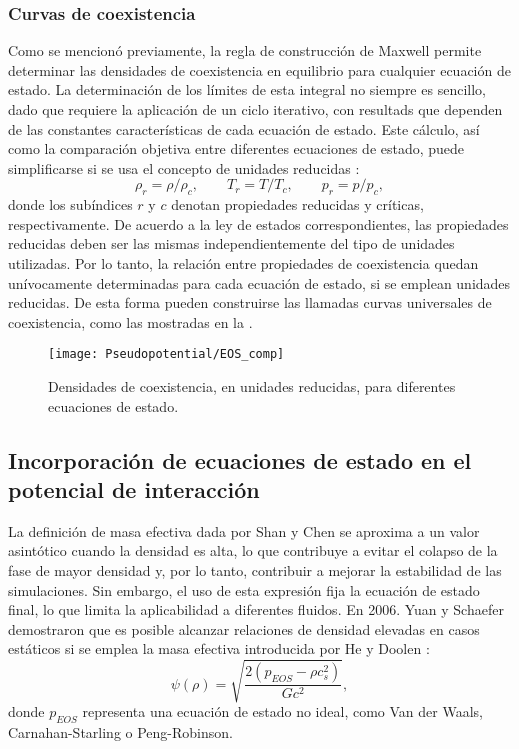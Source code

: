 

\subsubsection*{Curvas de coexistencia}

Como se mencion\'o previamente, la regla de construcci\'on de Maxwell permite determinar las densidades de coexistencia en equilibrio para cualquier ecuaci\'on de estado. La determinaci\'on de los l\'imites de esta integral no siempre es sencillo, dado que requiere la aplicaci\'on de un ciclo iterativo, con resultads que dependen de las constantes caracter\'isticas de cada ecuaci\'on de estado. Este c\'alculo, as\'i como la comparaci\'on objetiva entre diferentes ecuaciones de estado, puede simplificarse si se usa el concepto de unidades reducidas \cite{mcquarrie_molecular_1999}:
\begin{equation}
	\rho_r = \rho / \rho_c, \qquad T_r = T / T_c, \qquad p_r = p / p_c,
\end{equation}
donde los sub\'indices $r$ y $c$ denotan propiedades reducidas y cr\'iticas, respectivamente. De acuerdo a la ley de estados correspondientes, las propiedades reducidas deben ser las mismas independientemente del tipo de unidades utilizadas. Por lo tanto, la relaci\'on entre propiedades de coexistencia quedan un\'ivocamente determinadas para cada ecuaci\'on de estado, si se emplean unidades reducidas. De esta forma pueden construirse las llamadas curvas universales de coexistencia, como las mostradas en la .

\begin{figure}[ht]
	\centering
	\texttt{[image: Pseudopotential/EOS\_comp]}
	\caption{Densidades de coexistencia, en unidades reducidas, para diferentes ecuaciones de estado.}
	\label{fig:EOS}
\end{figure}





\subsection{Incorporaci\'on de ecuaciones de estado en el potencial de interacci\'on}

La definici\'on de masa efectiva dada por Shan y Chen se aproxima a un valor asint\'otico cuando la densidad es alta, lo que contribuye a evitar el colapso de la fase de mayor densidad y, por lo tanto, contribuir a mejorar la estabilidad de las simulaciones. Sin embargo, el uso de esta expresi\'on fija la ecuaci\'on de estado final, lo que limita la aplicabilidad a diferentes fluidos. En 2006. Yuan y Schaefer \cite{yuan_equations_2006} demostraron que es posible alcanzar relaciones de densidad elevadas en casos est\'aticos si se emplea la masa efectiva introducida por He y Doolen \cite{he_thermodynamic_2002}:
\begin{equation}
	\psi(\rho) = \sqrt{\dfrac{2(p_{EOS} - \rho c_s^2)}{Gc^2}},
\end{equation}
donde $p_{EOS}$ representa una ecuaci\'on de estado no ideal, como Van der Waals, Carnahan-Starling o Peng-Robinson.


